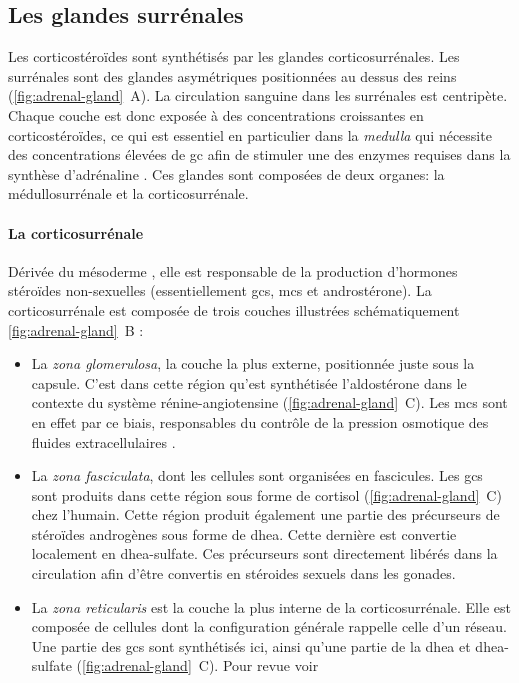 \documentclass[../main.tex]{subfiles}
\begin{document}

\subsection{Les glandes surrénales}
Les corticostéroïdes sont synthétisés par les glandes corticosurrénales.
Les surrénales sont des glandes asymétriques positionnées au dessus des reins (\autoref{fig:adrenal-gland}~A).
La circulation sanguine dans les surrénales est centripète.
Chaque couche est donc exposée à des concentrations croissantes en corticostéroïdes, ce qui est essentiel en particulier dans la \textit{medulla} qui nécessite des concentrations élevées de \gls{gc} afin de stimuler une des enzymes requises dans la synthèse d'adrénaline \citep{Nussey2001}.
Ces glandes sont composées de deux organes: la médullosurrénale et la corticosurrénale.



\paragraph{La corticosurrénale}
Dérivée du mésoderme \citep{Hammer2005}, elle est responsable de la production d'hormones stéroïdes non-sexuelles (essentiellement \glspl{gc}, \glspl{mc} et androstérone).
La corticosurrénale est composée de trois couches illustrées schématiquement \autoref{fig:adrenal-gland}~B \citep{Charlton1990,Parker1993} :
\begin{itemize}
\item La \textit{zona glomerulosa}, la couche la plus externe, positionnée juste sous la capsule.
C'est dans cette région qu'est synthétisée l'aldostérone dans le contexte du système rénine-angiotensine (\autoref{fig:adrenal-gland}~C).
Les \glspl{mc} sont en effet par ce biais, responsables du contrôle de la pression osmotique des fluides extracellulaires \citep{Feraco2013}.
\item La \textit{zona fasciculata}, dont les cellules sont organisées en fascicules. Les \glspl{gc} sont produits dans cette région sous forme de cortisol (\autoref{fig:adrenal-gland}~C) chez l'humain.
Cette région produit également une partie des précurseurs de stéroïdes androgènes sous forme de \gls{dhea}.
Cette dernière est convertie localement en \gls{dhea}-sulfate.
Ces précurseurs sont directement libérés dans la circulation afin d'être convertis en stéroides sexuels dans les gonades.
\item La \textit{zona reticularis} est la couche la plus interne de la corticosurrénale.
Elle est composée de cellules dont la configuration générale rappelle celle d'un réseau.
Une partie des \glspl{gc} sont synthétisés ici, ainsi qu'une partie de la \gls{dhea} et \gls{dhea}-sulfate (\autoref{fig:adrenal-gland}~C).
Pour revue voir \citep{McKay2003a}
\end{itemize}
\end{document}
